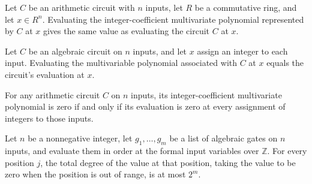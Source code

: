 \begin{theorem}
\label{Randomized.AlgCircuit.aeval_toMvPolynomial}
\leanok
{}
Let $C$ be an arithmetic circuit with $n$ inputs, let $R$ be a commutative ring, and let
$x\in R^n$. Evaluating the integer-coefficient multivariate polynomial represented by
$C$ at $x$ gives the same value as evaluating the circuit $C$ at $x$.
\end{theorem}

\begin{theorem}
\label{Randomized.AlgCircuit.eval_toMvPolynomial}
\leanok
{}
Let $C$ be an algebraic circuit on $n$ inputs, and let $x$ assign an integer to each
input. Evaluating the multivariable polynomial associated with $C$ at $x$ equals the
circuit's evaluation at $x$.
\end{theorem}

\begin{theorem}
\label{Randomized.AlgCircuit.toMvPolynomial_eq_zero_iff}
\leanok
{}
For any arithmetic circuit $C$ on $n$ inputs, its integer-coefficient multivariate
polynomial is zero if and only if its evaluation is zero at every assignment of integers
to those inputs.
\end{theorem}

\begin{theorem}
\label{Randomized.AlgCircuit.totalDegree_run_le}
\leanok
{}
Let $n$ be a nonnegative integer, let $g_1,\ldots,g_m$ be a list of algebraic gates on
$n$ inputs, and evaluate them in order at the formal input variables over $\mathbb{Z}$.
For every position $j$, the total degree of the value at that position, taking the value
to be zero when the position is out of range, is at most $2^m$.
\end{theorem}

